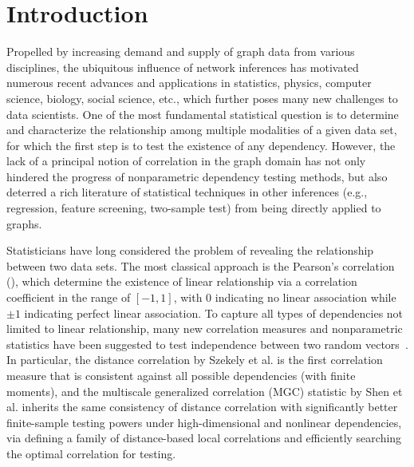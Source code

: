 \documentclass[11pt]{article}
\theoremstyle{definition}
\begin{document}
\section{Introduction}
\label{sec:intro}
	\vspace*{-0.2cm}
Propelled by increasing demand and supply of graph data from various disciplines, the ubiquitous influence of network inferences has motivated numerous recent advances and applications in statistics, physics, computer science, biology, social science, etc., which further poses many new challenges to data scientists. One of the most fundamental statistical question is to determine and characterize the relationship among multiple modalities of a given data set, for which the first step is to test the existence of any dependency. However, the lack of a principal notion of correlation in the graph domain has not only hindered the progress of nonparametric dependency testing methods, but also deterred a rich literature of statistical techniques in other inferences (e.g., regression, feature screening, two-sample test) from being directly applied to graphs.
 
Statisticians have long considered the problem of revealing the relationship between two data sets. The most classical approach is the Pearson's correlation (\cite{Pearson1895}), which determine the existence of linear relationship via a correlation coefficient in the range of $[-1,1]$, with $0$ indicating no linear association while $\pm 1$ indicating perfect linear association. To capture all types of dependencies not limited to linear relationship, many new correlation measures and nonparametric statistics have been suggested to test independence between two random vectors~\citep{mantel1967, RobertEscoufier1976, szekely2007measuring, GrettonGyorfi2010, Reshef2011, HellerGorfine2013,szekelyRizzo2013a, heller2016consistent, shen2016discovering}. In particular, the distance correlation by Szekely et al. \citep{szekely2007measuring} is the first correlation measure that is consistent against all possible dependencies (with finite moments), and the multiscale generalized correlation (MGC) statistic by Shen et al. \cite{shen2016discovering} inherits the same consistency of distance correlation with significantly better finite-sample testing powers under high-dimensional and nonlinear dependencies, via defining a family of distance-based local correlations and efficiently searching the optimal correlation for testing.
\end{document}
